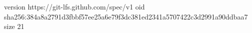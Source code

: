 version https://git-lfs.github.com/spec/v1
oid sha256:384a8a2791d3fbbf57ee25a6e79f3dc381ed2341a5707422c3d2991a90ddbaa7
size 21
